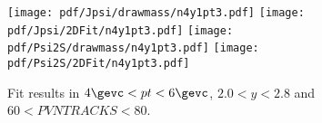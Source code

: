 \begin{figure}[H]
\begin{center}
\texttt{[image: pdf/Jpsi/drawmass/n4y1pt3.pdf]}
\texttt{[image: pdf/Jpsi/2DFit/n4y1pt3.pdf]}
\vspace*{-0.5cm}
\texttt{[image: pdf/Psi2S/drawmass/n4y1pt3.pdf]}
\texttt{[image: pdf/Psi2S/2DFit/n4y1pt3.pdf]}
\vspace*{-0.5cm}
\end{center}
\caption{Fit results in $4\gevc<pt<6\gevc$, $2.0<y<2.8$ and $60<PVNTRACKS<80$.}
\label{Fitn4y1pt3}
\end{figure}
